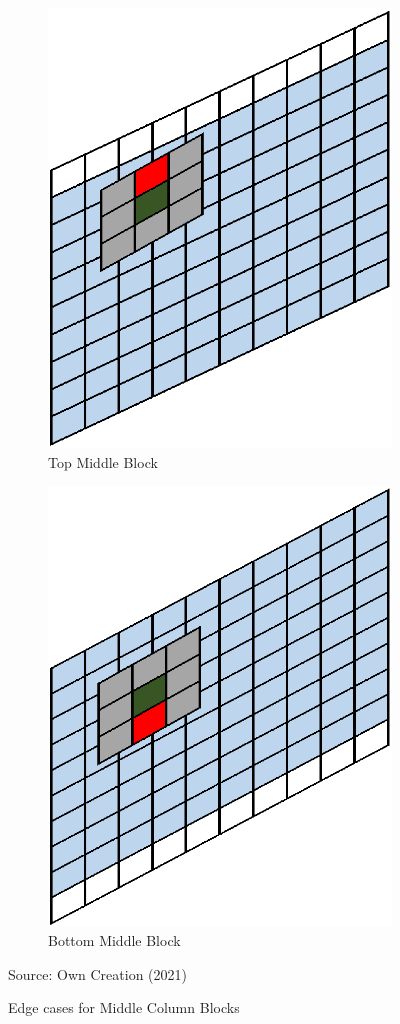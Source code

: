 \begin{figure}[H]
\centering
\begin{subfigure}{.5\textwidth}
  \centering
  \includegraphics[width=.5\linewidth]{Figures/Chapter3/topmid}
  \caption{Top Middle Block}
\end{subfigure}%
\begin{subfigure}{.5\textwidth}
  \centering
  \includegraphics[width=.5\linewidth]{Figures/Chapter3/botmid}
  \caption{Bottom Middle Block}
\end{subfigure}
\caption{Edge cases for Middle Column Blocks}
\begin{center}
Source: Own Creation (2021)
\end{center}
\end{figure}

